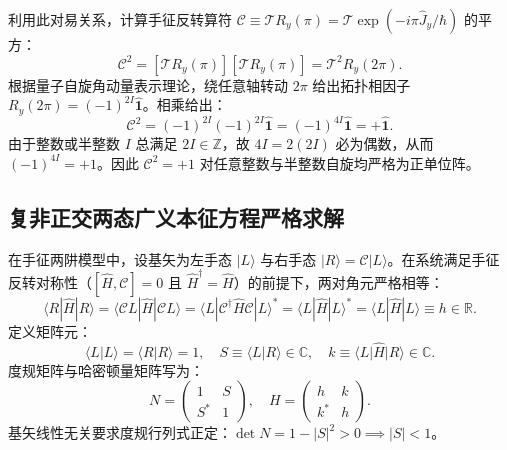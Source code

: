 利用此对易关系，计算手征反转算符 $\mathcal{C} \equiv \mathcal{T} R_y(\pi) = \mathcal{T} \exp(-i\pi \hat{J}_y / \hbar)$ 的平方：
\begin{equation}
\mathcal{C}^2 = [\mathcal{T} R_y(\pi)] [\mathcal{T} R_y(\pi)] = \mathcal{T}^2 R_y(2\pi).
\end{equation}
根据量子自旋角动量表示理论，绕任意轴转动 $2\pi$ 给出拓扑相因子 $R_y(2\pi) = (-1)^{2I} \hat{\mathbf{1}}$。相乘给出：
\begin{equation}\label{eq:appB-C-sq-proof}
\mathcal{C}^2 = (-1)^{2I} (-1)^{2I} \hat{\mathbf{1}} = (-1)^{4I} \hat{\mathbf{1}} = +\hat{\mathbf{1}}.
\end{equation}
由于整数或半整数 $I$ 总满足 $2I \in \mathbb{Z}$，故 $4I = 2(2I)$ 必为偶数，从而 $(-1)^{4I} = +1$。因此 $\mathcal{C}^2 = +1$ 对任意整数与半整数自旋均严格为正单位阵。

\subsection{复非正交两态广义本征方程严格求解}

在手征两阱模型中，设基矢为左手态 $|L\rangle$ 与右手态 $|R\rangle = \mathcal{C}|L\rangle$。在系统满足手征反转对称性（$[\hat{H}, \mathcal{C}] = 0$ 且 $\hat{H}^\dagger = \hat{H}$）的前提下，两对角元严格相等：
\begin{equation}
\langle R|\hat{H}|R\rangle = \langle \mathcal{C}L|\hat{H}|\mathcal{C}L\rangle = \langle L|\mathcal{C}^\dagger \hat{H} \mathcal{C}|L\rangle^* = \langle L|\hat{H}|L\rangle^* = \langle L|\hat{H}|L\rangle \equiv h \in \mathbb{R}.
\end{equation}
定义矩阵元：
\begin{equation}\label{eq:appB-two-state-elements}
\langle L|L\rangle = \langle R|R\rangle = 1, \quad S \equiv \langle L|R\rangle \in \mathbb{C}, \quad k \equiv \langle L|\hat{H}|R\rangle \in \mathbb{C}.
\end{equation}
度规矩阵与哈密顿量矩阵写为：
\begin{equation}\label{eq:appB-two-state-matrices}
N = \begin{pmatrix} 1 & S \\ S^* & 1 \end{pmatrix}, \quad H = \begin{pmatrix} h & k \\ k^* & h \end{pmatrix}.
\end{equation}
基矢线性无关要求度规行列式正定：$\det N = 1 - |S|^2 > 0 \implies |S| < 1$。

